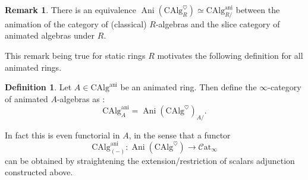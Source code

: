 \documentclass[11pt]{article}
\theoremstyle{definition}
\newtheorem{definition}[theorem]{Definition}
\newtheorem{remark}[theorem]{Remark}
\newcommand{\Ani}{\operatorname{Ani}}
\newcommand{\ani}{\mathrm{ani}}
\newcommand{\CAlg}{\mathrm{CAlg}}
\newcommand{\Catinf}{\mathcal{C}\mathrm{at}_{\infty}}
\newcommand{\heart}{\heartsuit}
\begin{document}
\begin{remark}
    There is an equivalence $\Ani(\CAlg_R^{\heart}) \simeq \CAlg^{\ani}_{R/}$ between the animation of the category of (classical) $R$-algebras and the slice category of animated algebras under $R$.
\end{remark}

This remark being true for static rings $R$ motivates the following definition for all animated rings.

\begin{definition}
    Let $A \in \CAlg^{\ani}$ be an animated ring.
    Then define the $\infty$-category of animated $A$-algebras as :
    \[
        \CAlg_A^{\ani} = \Ani(\CAlg^{\heart})_{A/}.
    \]
\end{definition}
In fact this is even functorial in $A$, in the sense that a functor
\[
    \CAlg_{(-)}^{\ani} : \Ani(\CAlg^{\heart}) \to \Catinf
\]
can be obtained by straightening the extension/restriction of scalars adjunction constructed above.
\end{document}

